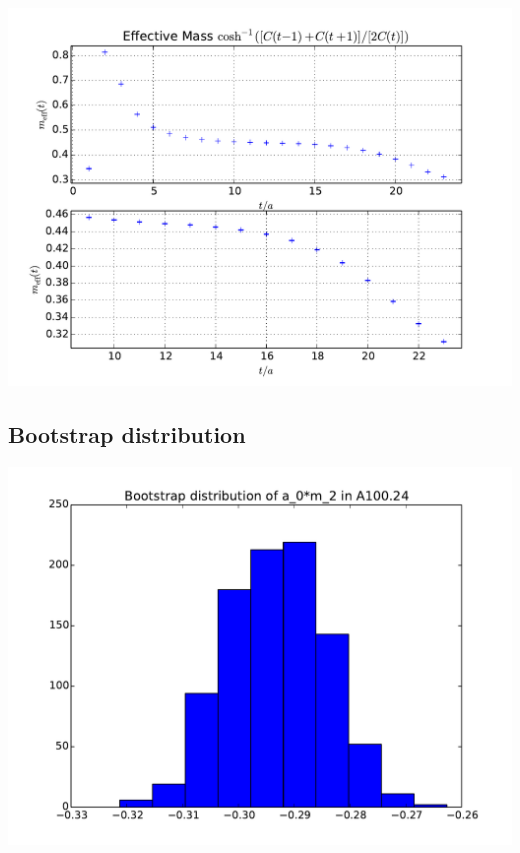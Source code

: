 \documentclass[english, fleqn]{beamer}
\begin{document}
\begin{frame}
    \begin{center}
        \includegraphics[height=\textheight]{plots/A100_24_L24_T48_beta190_mul0100_musig150_mudel190_kappa1632550__ev120__TB2_SO_LI6_new_c4_m_eff.pdf}
    \end{center}
\end{frame}

\subsection*{Bootstrap distribution}

\begin{frame}
    \begin{center}
        \includegraphics[height=\textheight]{plots/A100_24_L24_T48_beta190_mul0100_musig150_mudel190_kappa1632550__ev120__TB2_SO_LI6_new_boot-hist_a_0*m_2.pdf}
    \end{center}
\end{frame}
\end{document}
